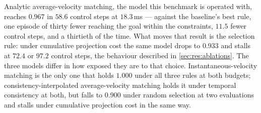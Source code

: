 Analytic average-velocity matching, the model this benchmark is operated with, reaches $0.967$ in $58.6$
control steps at $18.3$\,ms --- against the baseline's best rule, one episode of thirty fewer reaching
the goal within the constraints, $11.5$ fewer control steps, and a thirtieth of the time. What moves that
result is the selection rule: under cumulative projection cost the same model drops to $0.933$ and stalls
at $72.4$ or $97.2$ control steps, the
behaviour described in \autoref{sec:res:ablations}. The three models differ in how exposed they are to
that choice. Instantaneous-velocity matching is the only one that holds $1.000$ under all three rules at
both budgets; consistency-interpolated average-velocity matching holds it under temporal consistency at
both, but falls to $0.900$ under random selection at two evaluations and stalls under cumulative
projection cost in the same way.

